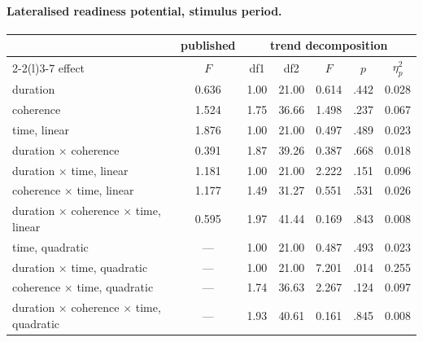 \paragraph{Lateralised readiness potential, stimulus period.}
\begin{center}\small
\begin{tabular}{lcccccc}
\toprule
 & \multicolumn{1}{c}{published} & \multicolumn{5}{c}{trend decomposition}\\
\cmidrule(lr){2-2}\cmidrule(l){3-7}
effect & $F$ & df1 & df2 & $F$ & $p$ & $\eta_p^2$\\
\midrule
duration & 0.636 & 1.00 & 21.00 & 0.614 & .442 & 0.028\\
coherence & 1.524 & 1.75 & 36.66 & 1.498 & .237 & 0.067\\
time, linear & 1.876 & 1.00 & 21.00 & 0.497 & .489 & 0.023\\
duration $\times$ coherence & 0.391 & 1.87 & 39.26 & 0.387 & .668 & 0.018\\
duration $\times$ time, linear & 1.181 & 1.00 & 21.00 & 2.222 & .151 & 0.096\\
coherence $\times$ time, linear & 1.177 & 1.49 & 31.27 & 0.551 & .531 & 0.026\\
duration $\times$ coherence $\times$ time, linear & 0.595 & 1.97 & 41.44 & 0.169 & .843 & 0.008\\
time, quadratic & --- & 1.00 & 21.00 & 0.487 & .493 & 0.023\\
duration $\times$ time, quadratic & --- & 1.00 & 21.00 & 7.201 & .014 & 0.255\\
coherence $\times$ time, quadratic & --- & 1.74 & 36.63 & 2.267 & .124 & 0.097\\
duration $\times$ coherence $\times$ time, quadratic & --- & 1.93 & 40.61 & 0.161 & .845 & 0.008\\
\bottomrule
\end{tabular}
\end{center}

